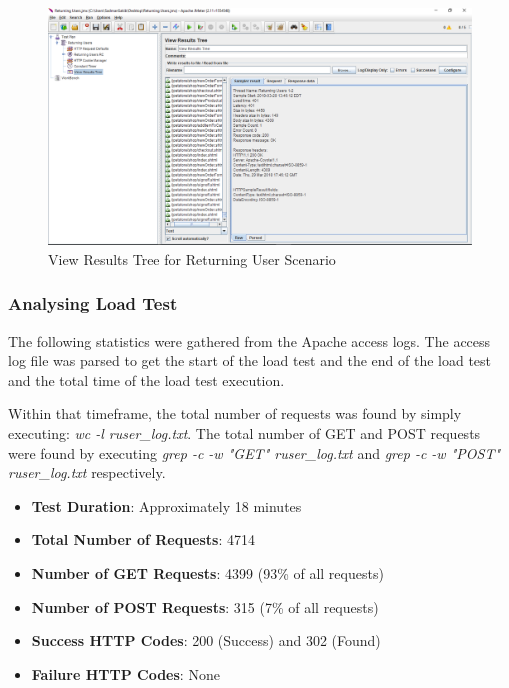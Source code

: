 \documentclass[fontsize=12pt,paper=letter,twoside]{scrartcl}
\begin{document}
\begin{figure}[!htb]
\begin{center}
\includegraphics[width=.9\textwidth]{../../load-test/test-plans/returning-user/result-tree.png}
\end{center}
\caption{View Results Tree for Returning User Scenario}
\label{fig:ruser:view_result_tree}
\end{figure}

\subsubsection{Analysing Load Test}
The following statistics were gathered from the Apache access logs. The access log file was parsed to get the start of the load test and the end of the load test and the total time of the load test execution.

\bigskip
\noindent Within that timeframe, the total number of requests was found by simply executing: \emph{wc -l ruser\_log.txt}. The total number of GET and POST requests were found by executing \emph{grep -c -w "GET" ruser\_log.txt} and \emph{grep -c -w "POST" ruser\_log.txt} respectively.

\begin{itemize}
\item \textbf{Test Duration}: Approximately 18 minutes
\item \textbf{Total Number of Requests}: 4714
\item \textbf{Number of GET Requests}: 4399 (93\% of all requests)
\item \textbf{Number of POST Requests}: 315 (7\% of all requests)
\item \textbf{Success HTTP Codes}: 200 (Success) and 302 (Found)
\item \textbf{Failure HTTP Codes}: None
\end{itemize}
\end{document}
